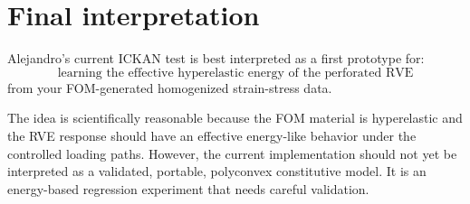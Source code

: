\documentclass[11pt]{article}
\begin{document}
\section{Final interpretation}

Alejandro's current ICKAN test is best interpreted as a first prototype for:
\[
  \boxed{
  \text{learning the effective hyperelastic energy of the perforated RVE}
  }
\]
from your FOM-generated homogenized strain-stress data.

The idea is scientifically reasonable because the FOM material is hyperelastic
and the RVE response should have an effective energy-like behavior under the
controlled loading paths. However, the current implementation should not yet be
interpreted as a validated, portable, polyconvex constitutive model. It is an
energy-based regression experiment that needs careful validation.
\end{document}
